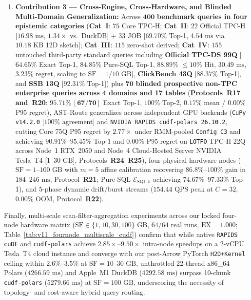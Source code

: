 \documentclass[10pt,a4paper]{article}
\begin{document}
\begin{enumerate}[leftmargin=1.5em,itemsep=1.5pt]
    \item \textbf{Contribution 3 --- Cross-Engine, Cross-Hardware, and Blinded Multi-Domain Generalization:} Across $\mathbf{400}$ \textbf{benchmark queries in four epistemic categories} (\textbf{Cat~I}: $75$ Core TPC-H; \textbf{Cat~II}: $22$ Official TPC-H [$16.98\text{ ms}$, $1.34\times$ vs.\ DuckDB] + $33$ JOB [$69.70\%$ Top-1, $4.54\text{ ms}$ via $10.18\text{ KB}$ 12D sketch]; \textbf{Cat~III}: $115$ zero-shot derived; \textbf{Cat~IV}: $155$ untouched third-party standard queries including \textbf{Official TPC-DS 99Q} [$64.65\%$ Exact Top-1, $\mathbf{84.85\%}$ Pure-SQL Top-1, $88.89\%$ $\le 10\%$ Hit, $30.49\text{ ms}$, $3.23\%$ regret, scaling to $\text{SF}=1/10\text{ GB}$], \textbf{ClickBench 43Q} [$88.37\%$ Top-1], and \textbf{SSB 13Q} [$92.31\%$ Top-1]) plus $\mathbf{70}$ \textbf{blinded prospective non-TPC enterprise queries across 4 domains and 17 tables} (\textbf{Protocols~R17 and~R20}: $\mathbf{95.71\%\ [67/70]}$ Exact Top-1, $100\%$ Top-2, $0.17\%$ mean / $0.00\%$ P95 regret), AST-Route generalizes across independent GPU backends (\texttt{CuPy v14.2.0} [$100\%$ agreement] and \texttt{NVIDIA RAPIDS cudf-polars 26.10.2}, cutting Core 75Q P95 regret by $\mathbf{2.77\times}$ under RMM-pooled \texttt{Config~C3} and achieving $\mathbf{90.91\%\text{--}95.45\%}$ Top-1 and $\mathbf{0.00\%}$ P95 regret on \texttt{LOTFO} TPC-H 22Q across Node~1 RTX~2050 and Node~4 Cloud-Hosted Server NVIDIA Tesla~T4 [$1\text{--}30\text{ GB}$], Protocols~\textbf{R24--R25}), four physical hardware nodes ($\text{SF}=1\text{--}100\text{ GB}$ with $m=5$ affine calibration recovering $86.8\%\text{--}100\%$ gain in $184\text{--}246\text{ ms}$, Protocol~\textbf{R21}; Pure-SQL $\mathcal{E}_{\text{SQL-5}}$ achieving $74.67\%\text{--}97.33\%$ Top-1), and 5-phase dynamic drift/burst streams ($154.44\text{ QPS}$ peak at $C=32$, $0.00\%$ OOM, Protocol~\textbf{R22}).
\end{enumerate}

\vspace{-8pt}


Finally, multi-scale scan-filter-aggregation experiments across our locked four-node hardware matrix ($\text{SF}\in\{1,10,30,100\}\text{ GB}$, $64/64$ real runs, $\text{EX}=1.000$; Table~\ref{tab:v11_fournode_multiscale_cudf}) confirm that while native \texttt{RAPIDS cuDF} and \texttt{cudf-polars} achieve $2.85\times\text{--}9.50\times$ intra-node speedups on a 2-vCPU Tesla~T4 cloud instance and converge with our post-Arrow PyTorch \texttt{H2D+Kernel} ceiling within $2.6\%\text{--}3.5\%$ at $\text{SF}=10\text{--}30\text{ GB}$, unthrottled 22-thread x86\_64 Polars ($4266.59\text{ ms}$) and Apple~M1 DuckDB ($4292.58\text{ ms}$) surpass 10-chunk \texttt{cudf-polars} ($5279.66\text{ ms}$) at $\text{SF}=100\text{ GB}$, underscoring the necessity of topology- and cost-aware hybrid query routing.
\end{document}
